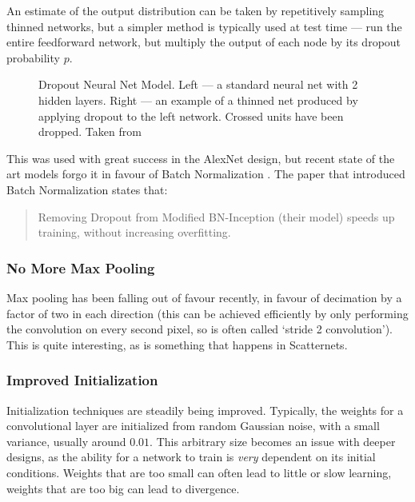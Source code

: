   An estimate of the output distribution can be taken by repetitively sampling
  thinned networks, but a simpler method is typically used at test time --- run
  the entire feedforward network, but multiply the output of each node by its
  dropout probability $p$. 

  \begin{figure}
    \centering
      \caption[Dropout Neural Net Model]
              {Dropout Neural Net Model. Left --- a standard neural net with
              2 hidden layers. Right --- an example of a thinned net produced by
              applying dropout to the left network. Crossed units have been
              dropped. Taken from \citep{srivastava_dropout:_2014}}\label{fig:dropout}
  \end{figure}

  This was used with great success in the AlexNet design, but recent state of
  the art models forgo it in favour of Batch Normalization \citep{he_deep_2015,
  szegedy_inception-v4_2016}. The paper that introduced Batch
  Normalization\citep{ioffe_batch_2015} states that:
  \begin{quote}
    Removing Dropout from Modified BN-Inception (their model) speeds up
    training, without increasing overfitting.
  \end{quote}

\subsubsection{No More Max Pooling}
      Max pooling has been falling out of favour recently, in favour of decimation
      by a factor of two in each direction \citep{springenberg_striving_2014} 
      (this can be achieved efficiently by only performing the convolution on
      every second pixel, so is often called `stride 2 convolution'). This is
      quite interesting, as is something that happens in Scatternets.
\subsubsection{Improved Initialization}
     Initialization techniques are steadily being improved. Typically, the weights
      for a convolutional layer are initialized from random Gaussian noise,
      with a small variance, usually around $0.01$. This arbitrary size becomes
      an issue with deeper designs, as the ability for a network to train is
      \emph{very} dependent on its initial conditions. Weights that are too
      small can often lead to little or slow learning, weights that are too big
      can lead to divergence.
      

